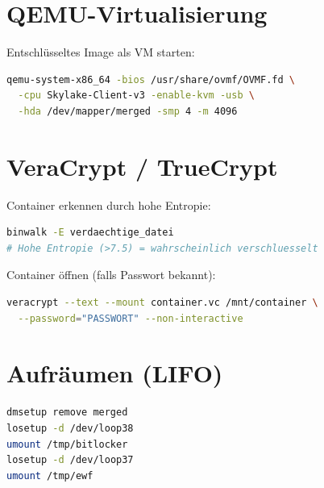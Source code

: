 \section{QEMU-Virtualisierung}

Entschlüsseltes Image als VM starten:

\begin{lstlisting}[language=bash]
qemu-system-x86_64 -bios /usr/share/ovmf/OVMF.fd \
  -cpu Skylake-Client-v3 -enable-kvm -usb \
  -hda /dev/mapper/merged -smp 4 -m 4096
\end{lstlisting}

\section{VeraCrypt / TrueCrypt}

Container erkennen durch hohe Entropie:

\begin{lstlisting}[language=bash]
binwalk -E verdaechtige_datei
# Hohe Entropie (>7.5) = wahrscheinlich verschluesselt
\end{lstlisting}

Container öffnen (falls Passwort bekannt):

\begin{lstlisting}[language=bash]
veracrypt --text --mount container.vc /mnt/container \
  --password="PASSWORT" --non-interactive
\end{lstlisting}

\section{Aufräumen (LIFO)}

\begin{lstlisting}[language=bash]
dmsetup remove merged
losetup -d /dev/loop38
umount /tmp/bitlocker
losetup -d /dev/loop37
umount /tmp/ewf
\end{lstlisting}
